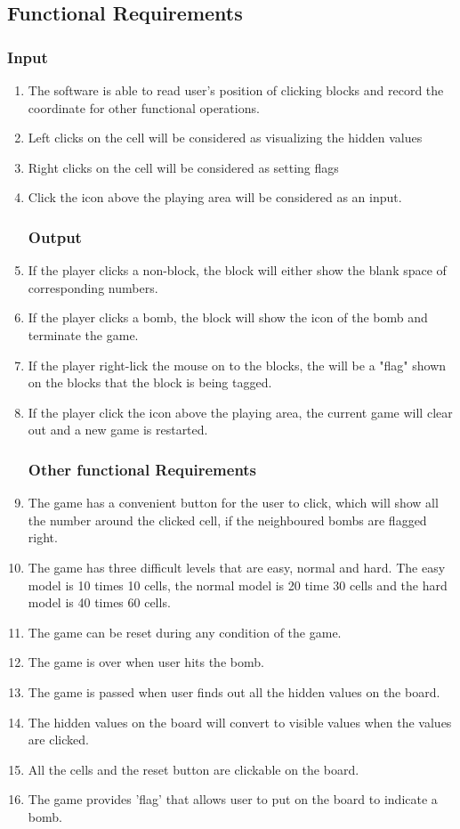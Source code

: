 \documentclass[10pt]{article}
\begin{document}
\subsection{Functional Requirements}
\subsubsection{Input}
\begin{enumerate}

    \item The software is able to read user's position of clicking blocks and record the coordinate for other functional operations.
    \item Left clicks on the cell will be considered as visualizing the hidden values
    \item Right clicks on the cell will be considered as setting flags
    \item Click the icon above the playing area will be considered as an input.


\subsubsection{Output}
    \item If the player clicks a non-block, the block will either show the blank space of corresponding numbers.
    \item If the player clicks a bomb, the block will show the icon of the bomb and terminate the game.
    \item If the player right-lick the mouse on to the blocks, the will be a "flag" shown on the blocks that the block is being tagged.
    \item If the player click the icon above the playing area, the current game will clear out and a new game is restarted.


\subsubsection{Other functional Requirements}

\item The game has a convenient button for the user to click, which will show all the number around the clicked cell, if the neighboured bombs are flagged right.
\item The game has three difficult levels that are easy, normal and hard. The easy model is 10 times 10 cells, the normal model is 20 time 30 cells and the hard model is 40 times 60 cells.
\item The game can be reset during any condition of the game.
\item The game is over when user hits the bomb.
\item The game is passed when user finds out all the hidden values on the board.
\item The hidden values on the board will convert to visible values when the values are clicked.
\item All the cells and the reset button are clickable on the board.
\item The game provides 'flag' that allows user to put on the board to indicate a bomb.
\end{enumerate}
\end{document}
